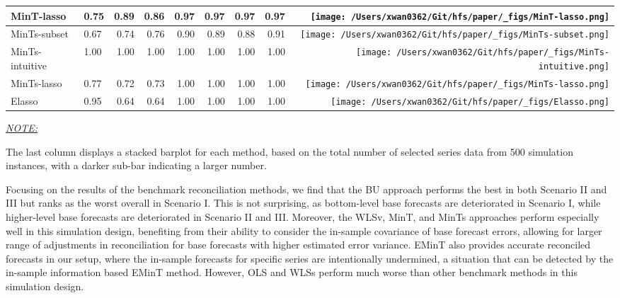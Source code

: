 \documentclass[11pt,a4paper,]{article}
\begin{document}
\begin{table}[!h]
{\begin{threeparttable}
\begin{tabular}{llrrrrrr>{}r}
MinT-lasso & 0.75 & 0.89 & 0.86 & 0.97 & 0.97 & 0.97 & 0.97 & \texttt{[image: /Users/xwan0362/Git/hfs/paper/\_figs/MinT-lasso.png]}\\
\midrule
MinTs-subset & 0.67 & 0.74 & 0.76 & 0.90 & 0.89 & 0.88 & 0.91 & \texttt{[image: /Users/xwan0362/Git/hfs/paper/\_figs/MinTs-subset.png]}\\
MinTs-intuitive & 1.00 & 1.00 & 1.00 & 1.00 & 1.00 & 1.00 & 1.00 & \texttt{[image: /Users/xwan0362/Git/hfs/paper/\_figs/MinTs-intuitive.png]}\\
MinTs-lasso & 0.77 & 0.72 & 0.73 & 1.00 & 1.00 & 1.00 & 1.00 & \texttt{[image: /Users/xwan0362/Git/hfs/paper/\_figs/MinTs-lasso.png]}\\
\midrule
Elasso & 0.95 & 0.64 & 0.64 & 1.00 & 1.00 & 1.00 & 1.00 & \texttt{[image: /Users/xwan0362/Git/hfs/paper/\_figs/Elasso.png]}\\
\bottomrule
\end{tabular}
\begin{tablenotes}[para]
\item \underline{\textit{NOTE:}} 
\item The last column displays a stacked barplot for each method, based on the total number of selected series data from 500 simulation instances, with a darker sub-bar indicating a larger number.
\end{tablenotes}
\end{threeparttable}}
\endgroup{}
\end{table}

Focusing on the results of the benchmark reconciliation methods, we find
that the BU approach performs the best in both Scenario II and III but
ranks as the worst overall in Scenario I. This is not surprising, as
bottom-level base forecasts are deteriorated in Scenario I, while
higher-level base forecasts are deteriorated in Scenario II and III.
Moreover, the WLSv, MinT, and MinTs approaches perform especially well
in this simulation design, benefiting from their ability to consider the
in-sample covariance of base forecast errors, allowing for larger range
of adjustments in reconciliation for base forecasts with higher
estimated error variance. EMinT also provides accurate reconciled
forecasts in our setup, where the in-sample forecasts for specific
series are intentionally undermined, a situation that can be detected by
the in-sample information based EMinT method. However, OLS and WLSs
perform much worse than other benchmark methods in this simulation
design.
\end{document}
